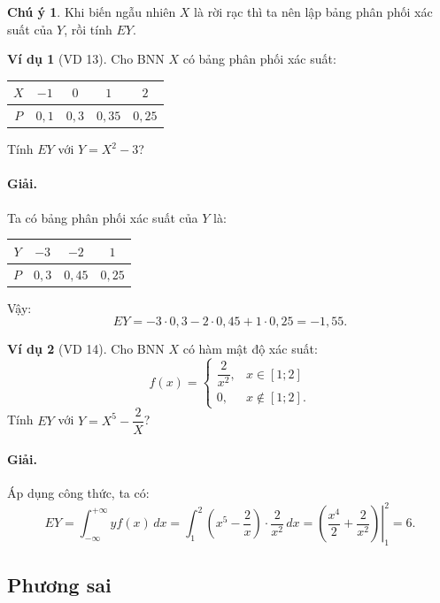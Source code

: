 \documentclass[12pt,a4paper]{article}
\theoremstyle{definition}
\newtheorem{vidu}{Ví dụ}[section]
\newtheorem{chuy}{Chú ý}[section]
\begin{document}
\begin{chuy}
Khi biến ngẫu nhiên $X$ là rời rạc thì ta nên lập bảng phân phối xác suất của $Y$, rồi tính $EY$.
\end{chuy}

\begin{vidu}[VD 13]
Cho BNN $X$ có bảng phân phối xác suất:
\begin{center}
\begin{tabular}{|c|c|c|c|c|}
\hline
$X$ & $-1$ & $0$ & $1$ & $2$ \\
\hline
$P$ & $0{,}1$ & $0{,}3$ & $0{,}35$ & $0{,}25$ \\
\hline
\end{tabular}
\end{center}
Tính $EY$ với $Y = X^2 - 3$?

\paragraph{Giải.} Ta có bảng phân phối xác suất của $Y$ là:
\begin{center}
\begin{tabular}{|c|c|c|c|}
\hline
$Y$ & $-3$ & $-2$ & $1$ \\
\hline
$P$ & $0{,}3$ & $0{,}45$ & $0{,}25$ \\
\hline
\end{tabular}
\end{center}
Vậy:
\[
EY = -3 \cdot 0{,}3 - 2 \cdot 0{,}45 + 1 \cdot 0{,}25 = -1{,}55.
\]
\end{vidu}

\begin{vidu}[VD 14]
Cho BNN $X$ có hàm mật độ xác suất:
\[
f(x) = \begin{cases}
\dfrac{2}{x^2}, & x \in [1; 2] \\
0, & x \notin [1; 2].
\end{cases}
\]
Tính $EY$ với $Y = X^5 - \dfrac{2}{X}$?

\paragraph{Giải.} Áp dụng công thức, ta có:
\[
EY = \int_{-\infty}^{+\infty} y f(x)\,dx = \int_1^2 \left(x^5 - \frac{2}{x}\right) \cdot \frac{2}{x^2}\,dx = \left.\left(\frac{x^4}{2} + \frac{2}{x^2}\right)\right|_1^2 = 6.
\]
\end{vidu}

\subsection{Phương sai}
\end{document}
